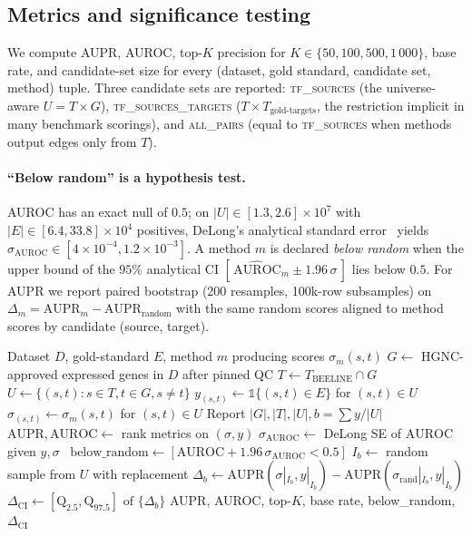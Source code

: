 \documentclass[sigconf]{acmart}
\begin{document}
\subsection{Metrics and significance testing}

We compute AUPR, AUROC, top-$K$ precision for
$K \in \{50, 100, 500, 1\,000\}$, base rate, and candidate-set size for
every (dataset, gold standard, candidate set, method) tuple. Three
candidate sets are reported: \textsc{tf\_sources} (the universe-aware
$U = T \times G$), \textsc{tf\_sources\_targets}
($T \times T_{\text{gold-targets}}$, the
restriction implicit in many benchmark scorings), and \textsc{all\_pairs}
(equal to \textsc{tf\_sources} when methods output edges only from $T$).

\paragraph{``Below random'' is a hypothesis test.}
AUROC has an exact null of $0.5$; on $|U| \in [1.3, 2.6] \times 10^7$
with $|E| \in [6.4, 33.8] \times 10^4$ positives, DeLong's analytical
standard error~\cite{delong1988} yields $\sigma_{\text{AUROC}} \in
[4\!\times\!10^{-4}, 1.2\!\times\!10^{-3}]$. A method $m$ is declared
\emph{below random} when the upper bound of the $95\%$ analytical CI
$[\,\widehat{\text{AUROC}}_m \pm 1.96\,\sigma\,]$ lies below $0.5$.
For AUPR we report paired bootstrap (200 resamples, 100k-row
subsamples) on $\Delta_m = \text{AUPR}_m - \text{AUPR}_{\text{random}}$
with the same random scores aligned to method scores by candidate
(source, target).

\begin{algorithm}[t]
\caption{Universe-aware GRN evaluation}
\label{alg:universe}
\begin{algorithmic}[1]
\Require Dataset $D$, gold-standard $E$, method $m$ producing scores
$\sigma_m(s, t)$
\State $G \gets$ HGNC-approved expressed genes in $D$ after pinned QC
\State $T \gets T_{\text{BEELINE}} \cap G$
\State $U \gets \{ (s, t) : s \in T, t \in G, s \neq t \}$
\State $y_{(s,t)} \gets \mathbb{1}\{(s,t) \in E\}$ for $(s,t) \in U$
\State $\sigma_{(s,t)} \gets \sigma_m(s,t)$ for $(s,t) \in U$
\State Report $|G|, |T|, |U|, b = \sum y / |U|$
\State $\text{AUPR}, \text{AUROC} \gets $ rank metrics on
$(\sigma, y)$
\State $\sigma_{\text{AUROC}} \gets$ DeLong SE of $\text{AUROC}$ given
$y, \sigma$~\cite{delong1988}
\State $\text{below\_random} \gets
       [\text{AUROC} + 1.96\,\sigma_{\text{AUROC}} < 0.5]$
  \State $I_b \gets$ random sample from $U$ with replacement
  \State $\Delta_b \gets \text{AUPR}(\sigma|_{I_b}, y|_{I_b}) -
         \text{AUPR}(\sigma_{\text{rand}}|_{I_b}, y|_{I_b})$
\EndFor
\State $\Delta_{\text{CI}} \gets [\text{Q}_{2.5}, \text{Q}_{97.5}]
       \text{ of } \{\Delta_b\}$
\State \Return AUPR, AUROC, top-$K$, base rate, below\_random,
       $\Delta_{\text{CI}}$
\end{algorithmic}
\end{algorithm}
\end{document}
